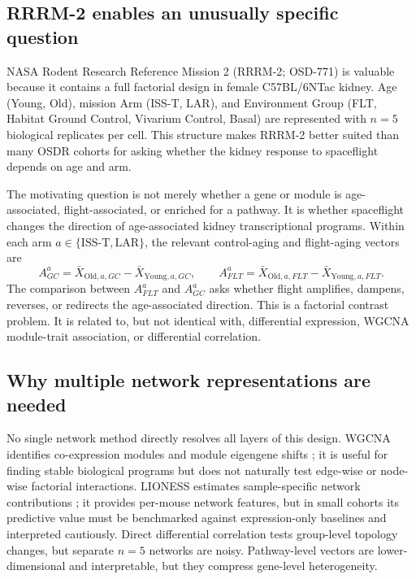 \documentclass[11pt]{article}
\begin{document}
\subsection{RRRM-2 enables an unusually specific question}

NASA Rodent Research Reference Mission 2 (RRRM-2; OSD-771) is valuable because it contains a full factorial design in female C57BL/6NTac kidney. Age (Young, Old), mission Arm (ISS-T, LAR), and Environment Group (FLT, Habitat Ground Control, Vivarium Control, Basal) are represented with $n=5$ biological replicates per cell. This structure makes RRRM-2 better suited than many OSDR cohorts for asking whether the kidney response to spaceflight depends on age and arm.

The motivating question is not merely whether a gene or module is age-associated, flight-associated, or enriched for a pathway. It is whether spaceflight changes the direction of age-associated kidney transcriptional programs. Within each arm $a \in \{\mathrm{ISS\mbox{-}T},\mathrm{LAR}\}$, the relevant control-aging and flight-aging vectors are
\begin{equation}
A^{a}_{GC} = \bar{X}_{\mathrm{Old},a,GC} - \bar{X}_{\mathrm{Young},a,GC},
\qquad
A^{a}_{FLT} = \bar{X}_{\mathrm{Old},a,FLT} - \bar{X}_{\mathrm{Young},a,FLT}.
\end{equation}
The comparison between $A^{a}_{FLT}$ and $A^{a}_{GC}$ asks whether flight amplifies, dampens, reverses, or redirects the age-associated direction. This is a factorial contrast problem. It is related to, but not identical with, differential expression, WGCNA module-trait association, or differential correlation.

\subsection{Why multiple network representations are needed}

No single network method directly resolves all layers of this design. WGCNA identifies co-expression modules and module eigengene shifts \citep{langfelder2008wgcna}; it is useful for finding stable biological programs but does not naturally test edge-wise or node-wise factorial interactions. LIONESS estimates sample-specific network contributions \citep{kuijjer2019estimating}; it provides per-mouse network features, but in small cohorts its predictive value must be benchmarked against expression-only baselines and interpreted cautiously. Direct differential correlation tests group-level topology changes, but separate $n=5$ networks are noisy. Pathway-level vectors are lower-dimensional and interpretable, but they compress gene-level heterogeneity.
\end{document}
